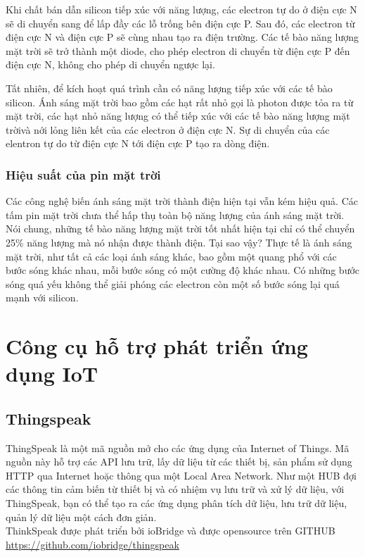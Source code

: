 Khi chất bán dẫn silicon tiếp xúc với năng lượng, các electron tự do ở điện cực N sẽ di chuyển sang để lấp đầy các lỗ trống bên điện cực P. Sau đó, các electron từ điện cực N và điện cực P sẽ cùng nhau tạo ra điện trường. Các tế bào năng lượng mặt trời sẽ trở thành một diode, cho phép electron di chuyển từ điện cực P đến điện cực N, không cho phép di chuyển ngược lại.

Tất nhiên, để kích hoạt quá trình cần có năng lượng tiếp xúc với các tế bào silicon. Ánh sáng mặt trời bao gồm các hạt rất nhỏ gọi là photon được tỏa ra từ mặt trời, các hạt nhỏ năng lượng có thể tiếp xúc với các tế bào năng lượng mặt trờivà nới lỏng liên kết của các electron ở điện cực N. Sự di chuyển của các elentron tự do từ điện cực N tới điện cực P tạo ra dòng điện.





\subsubsection*{Hiệu suất của pin mặt trời}
Các công nghệ biến ánh sáng mặt trời thành điện hiện tại vẫn kém hiệu quả. Các tấm pin mặt trời chưa thể hấp thụ toàn bộ năng lượng của ánh sáng mặt trời. Nói chung, những tế bào năng lượng mặt trời tốt nhất hiện tại chỉ có thể chuyển 25\% năng lượng mà nó nhận được thành điện. Tại sao vậy? Thực tế là ánh sáng mặt trời, như tất cả các loại ánh sáng khác, bao gồm một quang phổ với các bước sóng khác nhau, mỗi bước sóng có một cường độ khác nhau. Có những bước sóng quá yếu không thể giải phóng các electron còn một số bước sóng lại quá mạnh với silicon.

\section{Công cụ hỗ trợ phát triển ứng dụng IoT}
\subsection{Thingspeak}
ThingSpeak là một mã nguồn mở cho các ứng dụng của Internet of Things. Mã nguồn này hỗ trợ các API lưu trữ, lấy dữ liệu từ các thiết bị, sản phẩm sử dụng HTTP qua Internet hoặc thông qua một Local Area Network. Như một HUB đợi các thông tin cảm biến từ thiết bị và có nhiệm vụ lưu trữ và xử lý dữ liệu, với ThingSpeak, bạn có thể tạo ra các ứng dụng phân tích dữ liệu, lưu trữ dữ liệu, quản lý dữ liệu một cách đơn giản.\\
ThinkSpeak được phát triển bởi ioBridge và được opensource trên GITHUB  \url{https://github.com/iobridge/thingspeak}

